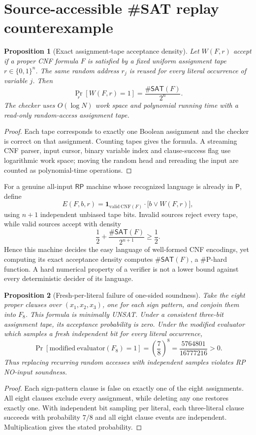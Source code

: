 \documentclass[11pt]{article}
\newtheorem{proposition}{Proposition}
\newcommand{\RP}{\mathsf{RP}}
\newcommand{\PP}{\mathsf{P}}
\newcommand{\SAT}{\mathsf{SAT}}
\begin{document}
\section{Source-accessible \#SAT replay counterexample}
\begin{proposition}[Exact assignment-tape acceptance density]
Let $W(F,r)$ accept if a proper CNF formula $F$ is satisfied by a fixed uniform assignment tape $r\in\{0,1\}^{n}$. The same random address $r_j$ is reused for every literal occurrence of variable $j$. Then
\[
\Pr_r[W(F,r)=1]=\frac{\#\SAT(F)}{2^n}.
\]
The checker uses $O(\log N)$ work space and polynomial running time with a read-only random-access assignment tape.
\end{proposition}
\begin{proof}
Each tape corresponds to exactly one Boolean assignment and the checker is correct on that assignment. Counting tapes gives the formula. A streaming CNF parser, input cursor, binary variable index and clause-success flag use logarithmic work space; moving the random head and rereading the input are counted as polynomial-time operations.
\end{proof}

For a genuine all-input $\RP$ machine whose recognized language is already in $\PP$, define
\[
E(F,b,r)=\mathbf 1_{\mathrm{valid\ CNF}(F)}\cdot
 \bigl[b\lor W(F,r)\bigr],
\]
using $n+1$ independent unbiased tape bits. Invalid sources reject every tape, while valid sources accept with density
\[
\frac12+\frac{\#\SAT(F)}{2^{n+1}}\ge\frac12.
\]
Hence this machine decides the easy language of well-formed CNF encodings, yet computing its exact acceptance density computes $\#\SAT(F)$, a $\#\mathrm P$-hard function. A hard numerical property of a verifier is not a lower bound against every deterministic decider of its language.

\begin{proposition}[Fresh-per-literal failure of one-sided soundness]
Take the eight proper clauses over $(x_1,x_2,x_3)$, one for each sign pattern, and conjoin them into $F_8$. This formula is minimally UNSAT. Under a consistent three-bit assignment tape, its acceptance probability is zero. Under the modified evaluator which samples a fresh independent bit for every literal occurrence,
\[
\Pr[\mathrm{modified\ evaluator}(F_8)=1]
=\left(\frac78\right)^8
=\frac{5764801}{16777216}>0.
\]
Thus replacing recurring random accesses with independent samples violates RP NO-input soundness.
\end{proposition}
\begin{proof}
Each sign-pattern clause is false on exactly one of the eight assignments. All eight clauses exclude every assignment, while deleting any one restores exactly one. With independent bit sampling per literal, each three-literal clause succeeds with probability $7/8$ and all eight clause events are independent. Multiplication gives the stated probability.
\end{proof}
\end{document}
